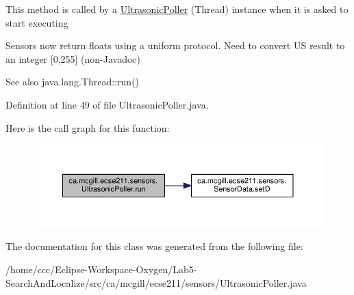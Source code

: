 This method is called by a \hyperlink{classca_1_1mcgill_1_1ecse211_1_1sensors_1_1_ultrasonic_poller}{Ultrasonic\+Poller} (Thread) instance when it is asked to start executing

Sensors now return floats using a uniform protocol. Need to convert US result to an integer \mbox{[}0,255\mbox{]} (non-\/\+Javadoc)

\begin{DoxySeeAlso}{See also}
java.\+lang.\+Thread\+::run() 
\end{DoxySeeAlso}


Definition at line 49 of file Ultrasonic\+Poller.\+java.

Here is the call graph for this function\+:
\nopagebreak
\begin{figure}[H]
\begin{center}
\leavevmode
\includegraphics[width=350pt]{classca_1_1mcgill_1_1ecse211_1_1sensors_1_1_ultrasonic_poller_acc71fac612a72c197244c71d6cf7b6e1_cgraph}
\end{center}
\end{figure}


The documentation for this class was generated from the following file\+:\begin{DoxyCompactItemize}
\item 
/home/ccc/\+Eclipse-\/\+Workspace-\/\+Oxygen/\+Lab5-\/\+Search\+And\+Localize/src/ca/mcgill/ecse211/sensors/Ultrasonic\+Poller.\+java\end{DoxyCompactItemize}

